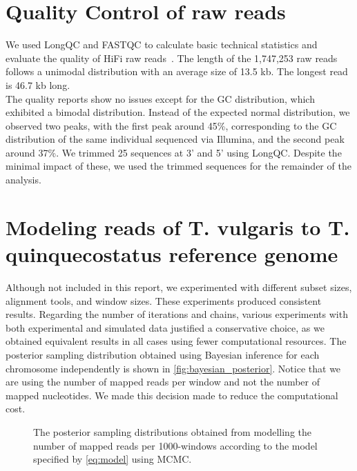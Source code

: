 \section{Quality Control of raw reads}

We used LongQC and FASTQC to calculate basic technical statistics and evaluate the quality of HiFi raw reads~\cite{fukasawaLongQCQualityControl2020,BabrahamBioinformaticsFastQC}. The length of the 1,747,253 raw reads follows a unimodal distribution with an average size of 13.5 kb. The longest read is 46.7 kb long. \\

The quality reports show no issues except for the GC distribution, which exhibited a bimodal distribution. Instead of the expected normal distribution, we observed two peaks, with the first peak around 45\%, corresponding to the GC distribution of the same individual sequenced via Illumina, and the second peak around 37\%. We trimmed 25 sequences at 3' and 5' using LongQC. Despite the minimal impact of these, we used the trimmed sequences for the remainder of the analysis. \\

\section{Modeling reads of T. vulgaris to T. quinquecostatus reference genome}

Although not included in this report, we experimented with different subset sizes, alignment tools, and window sizes. These experiments produced consistent results. Regarding the number of iterations and chains, various experiments with both experimental and simulated data justified a conservative choice, as we obtained equivalent results in all cases using fewer computational resources. The posterior sampling distribution obtained using Bayesian inference for each chromosome independently is shown in \autoref{fig:bayesian_posterior}. Notice that we are using the number of mapped reads per window and not the number of mapped nucleotides. We made this decision made to reduce the computational cost. \\

\graphicspath{{gfx/}}
\begin{sidewaysfigure}
\centering

\caption{The posterior sampling distributions obtained from modelling the number of mapped reads per 1000-windows according to the model specified by \eqref{eq:model} using MCMC. }    
\label{fig:bayesian_posterior}

\end{sidewaysfigure}    

